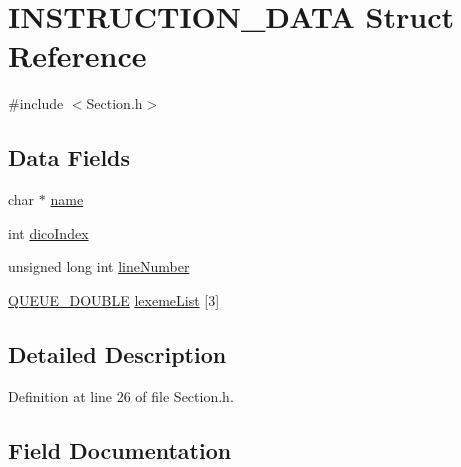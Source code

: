 \hypertarget{struct_i_n_s_t_r_u_c_t_i_o_n___d_a_t_a}{}\section{I\+N\+S\+T\+R\+U\+C\+T\+I\+O\+N\+\_\+\+D\+A\+TA Struct Reference}
\label{struct_i_n_s_t_r_u_c_t_i_o_n___d_a_t_a}


{\ttfamily \#include $<$Section.\+h$>$}

\subsection*{Data Fields}
\begin{DoxyCompactItemize}
\item 
char $\ast$ \mbox{\hyperlink{struct_i_n_s_t_r_u_c_t_i_o_n___d_a_t_a_a5ac083a645d964373f022d03df4849c8}{name}}
\item 
int \mbox{\hyperlink{struct_i_n_s_t_r_u_c_t_i_o_n___d_a_t_a_aec7094f9cb34475b821d28935acbf190}{dico\+Index}}
\item 
unsigned long int \mbox{\hyperlink{struct_i_n_s_t_r_u_c_t_i_o_n___d_a_t_a_a3f19ebeaa8c130292bd9ce502be1d1a3}{line\+Number}}
\item 
\mbox{\hyperlink{_double_queue_generic_8h_ac9780889f9bbabed708ecbeaadfb040e}{Q\+U\+E\+U\+E\+\_\+\+D\+O\+U\+B\+LE}} \mbox{\hyperlink{struct_i_n_s_t_r_u_c_t_i_o_n___d_a_t_a_a1ec7ee0298e9787963cc388b3e812414}{lexeme\+List}} \mbox{[}3\mbox{]}
\end{DoxyCompactItemize}


\subsection{Detailed Description}


Definition at line 26 of file Section.\+h.



\subsection{Field Documentation}
\mbox{\label{struct_i_n_s_t_r_u_c_t_i_o_n___d_a_t_a_aec7094f9cb34475b821d28935acbf190}} 
